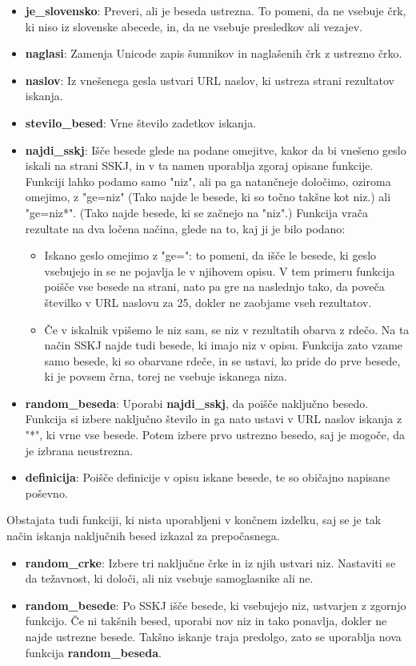 \documentclass [a4paper, 12pt] {article}
\begin{document}
\begin {itemize}
\item \textbf {je\_slovensko}: Preveri, ali je beseda ustrezna. To pomeni, da ne vsebuje črk, ki niso iz slovenske abecede, in, da ne vsebuje presledkov ali vezajev.
\item \textbf {naglasi}: Zamenja Unicode zapis šumnikov in naglašenih črk z ustrezno črko.
\item \textbf {naslov}: Iz vnešenega gesla ustvari URL naslov, ki ustreza strani rezultatov iskanja.
\item \textbf {stevilo\_besed}: Vrne število zadetkov iskanja.
\item \textbf {najdi\_sskj}: Išče besede glede na podane omejitve, kakor da bi vnešeno geslo iskali na strani SSKJ, in v ta namen uporablja zgoraj opisane funkcije. Funkciji lahko podamo samo "niz", ali pa ga natančneje določimo, oziroma omejimo, z "ge=niz" (Tako najde le besede, ki so točno takšne kot niz.) ali "ge=niz*". (Tako najde besede, ki se začnejo na "niz".) Funkcija vrača rezultate na dva ločena načina, glede na to, kaj ji je bilo podano:
\begin {itemize}
\item Iskano geslo omejimo z "ge=": to pomeni, da išče le besede, ki geslo vsebujejo in se ne pojavlja le v njihovem opisu. V tem primeru funkcija poišče vse besede na strani, nato pa gre na naslednjo tako, da poveča številko v URL naslovu za 25, dokler ne zaobjame vseh rezultatov.
\item Če v iskalnik vpišemo le niz sam, se niz v rezultatih obarva z rdečo. Na ta način SSKJ najde tudi besede, ki imajo niz v opisu. Funkcija zato vzame samo besede, ki so obarvane rdeče, in se ustavi, ko pride do prve besede, ki je povsem črna, torej ne vsebuje iskanega niza.
\end {itemize}
\item \textbf {random\_beseda}: Uporabi \textbf {najdi\_sskj}, da poišče naključno besedo. Funkcija si izbere naključno število in ga nato ustavi v URL naslov iskanja z "*", ki vrne vse besede. Potem izbere prvo ustrezno besedo, saj je mogoče, da je izbrana neustrezna.
\item \textbf {definicija}: Poišče definicije v opisu iskane besede, te so običajno napisane poševno.
\end {itemize} 
Obstajata tudi funkciji, ki nista uporabljeni v končnem izdelku, saj se je tak način iskanja naključnih besed izkazal za prepočasnega.
\begin {itemize}
\item \textbf {random\_crke}: Izbere tri naključne črke in iz njih ustvari niz. Nastaviti se da težavnost, ki določi, ali niz vsebuje samoglasnike ali ne.
\item \textbf {random\_besede}: Po SSKJ išče besede, ki vsebujejo niz, ustvarjen z zgornjo funkcijo. Če ni takšnih besed, uporabi nov niz in tako ponavlja, dokler ne najde ustrezne besede. Takšno iskanje traja predolgo, zato se uporablja nova funkcija \textbf {random\_beseda}.
\end {itemize}
\end{document}
